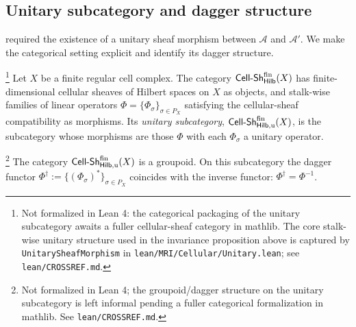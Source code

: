 \subsection{Unitary subcategory and dagger structure}\label{subsec:sheafbw-unitary-subcat}

 required the existence of a unitary
sheaf morphism between $\mathscr{A}$ and $\mathscr{A}'$. We make
the categorical setting explicit and identify its dagger structure.

\begin{definition}\label{def:unitary-subcat}\footnote{Not formalized in Lean 4: the categorical packaging of the unitary subcategory awaits a fuller cellular-sheaf category in mathlib. The core stalk-wise unitary structure used in the invariance proposition above is captured by \texttt{UnitarySheafMorphism} in \texttt{lean/MRI/Cellular/Unitary.lean}; see \texttt{lean/CROSSREF.md}.}
Let $X$ be a finite regular cell complex. The category
$\mathsf{Cell\text{-}Sh}^{\mathrm{fin}}_{\mathsf{Hilb}}(X)$ has finite-dimensional cellular sheaves
of Hilbert spaces on $X$ as objects, and stalk-wise families of
linear operators $\Phi = \{\Phi_\sigma\}_{\sigma \in P_X}$
satisfying the cellular-sheaf compatibility as morphisms. Its
\emph{unitary subcategory}, $\mathsf{Cell\text{-}Sh}^{\mathrm{fin}}_{\mathsf{Hilb},\mathrm{u}}(X)$,
is the subcategory whose morphisms are those $\Phi$ with each
$\Phi_\sigma$ a unitary operator.
\end{definition}

\begin{proposition}\label{prop:unitary-groupoid}\footnote{Not formalized in Lean 4; the groupoid/dagger structure on the unitary subcategory is left informal pending a fuller categorical formalization in mathlib. See \texttt{lean/CROSSREF.md}.}
The category $\mathsf{Cell\text{-}Sh}^{\mathrm{fin}}_{\mathsf{Hilb},\mathrm{u}}(X)$ is a groupoid.
On this subcategory the dagger functor
$\Phi^\dagger := \{(\Phi_\sigma)^*\}_{\sigma \in P_X}$ coincides
with the inverse functor: $\Phi^\dagger = \Phi^{-1}$.
\end{proposition}

